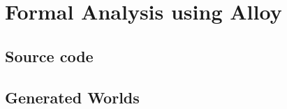\setlength{\parindent}{4ex}
\setlength{\parskip}{1ex}

\section{Formal Analysis using Alloy}

\subsection{Source code}
		
		
\subsection{Generated Worlds}

\clearpage
